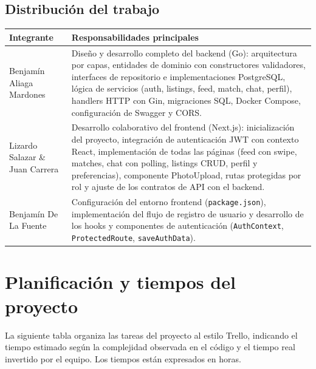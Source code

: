 \documentclass[12pt,a4paper]{article}
\begin{document}
\subsection{Distribución del trabajo}

\begin{center}
\begin{tabular}{lp{9.5cm}}
  \toprule
  \textbf{Integrante} & \textbf{Responsabilidades principales} \\
  \midrule
  Benjamín Aliaga Mardones
    & Diseño y desarrollo completo del backend (Go): arquitectura por capas, entidades de
      dominio con constructores validadores, interfaces de repositorio e implementaciones
      PostgreSQL, lógica de servicios (auth, listings, feed, match, chat, perfil),
      handlers HTTP con Gin, migraciones SQL, Docker Compose, configuración de Swagger
      y CORS. \\[5pt]
  Lizardo Salazar \& Juan Carrera
    & Desarrollo colaborativo del frontend (Next.js): inicialización del proyecto,
      integración de autenticación JWT con contexto React, implementación de todas las
      páginas (feed con swipe, matches, chat con polling, listings CRUD, perfil y
      preferencias), componente PhotoUpload, rutas protegidas por rol y ajuste de los
      contratos de API con el backend. \\[5pt]
  Benjamín De La Fuente
    & Configuración del entorno frontend (\texttt{package.json}), implementación del
      flujo de registro de usuario y desarrollo de los hooks y componentes de
      autenticación (\texttt{AuthContext}, \texttt{ProtectedRoute},
      \texttt{saveAuthData}). \\
  \bottomrule
\end{tabular}
\end{center}

\clearpage
\section{Planificación y tiempos del proyecto}

La siguiente tabla organiza las tareas del proyecto al estilo Trello, indicando el tiempo
estimado según la complejidad observada en el código y el tiempo real invertido por el equipo. Los tiempos están expresados en horas.
\end{document}
